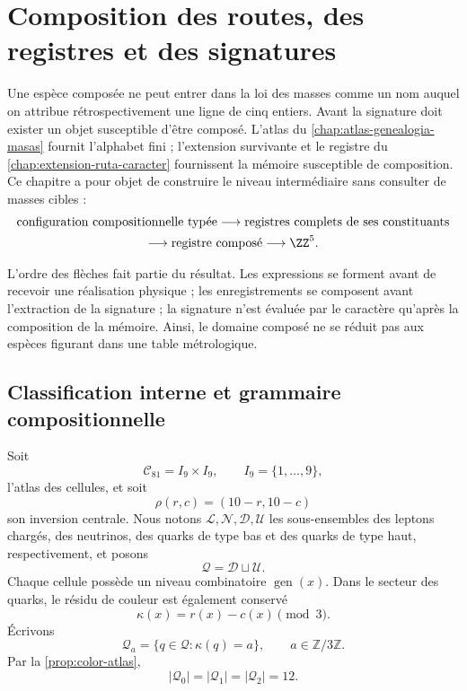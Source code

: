 \chapter{Composition des routes, des registres et des signatures}
\label{chap:composicion-especies-rev6}

Une espèce composée ne peut entrer dans la loi des masses comme un nom auquel on attribue rétrospectivement une ligne de cinq entiers. Avant la signature doit exister un objet susceptible d'être composé. L'atlas du \cref{chap:atlas-genealogia-masas} fournit l'alphabet fini ; l'extension survivante et le registre du \cref{chap:extension-ruta-caracter} fournissent la mémoire susceptible de composition. Ce chapitre a pour objet de construire le niveau intermédiaire sans consulter de masses cibles :
\[
\begin{gathered}
 \text{configuration compositionnelle typée}
 \longrightarrow
 \text{registres complets de ses constituants}\\
 \longrightarrow
 \text{registre composé}
 \longrightarrow
 \ZZ^5.
\end{gathered}
\]

L’ordre des flèches fait partie du résultat. Les expressions se forment avant de recevoir une réalisation physique ; les enregistrements se composent avant l’extraction de la signature ; la signature n’est évaluée par le caractère qu’après la composition de la mémoire. Ainsi, le domaine composé ne se réduit pas aux espèces figurant dans une table métrologique.

\section{Classification interne et grammaire compositionnelle}
\label{sec:alfabeto-composicional-rev6}

Soit
\[
 \mathcal C_{81}=I_9\times I_9,
 \qquad I_9=\{1,\ldots,9\},
\]
l’atlas des cellules, et soit
\[
 \rho(r,c)=(10-r,10-c)
\]
son inversion centrale. Nous notons \(\mathcal L,\mathcal N,\mathcal D,\mathcal U\) les sous-ensembles des leptons chargés, des neutrinos, des quarks de type bas et des quarks de type haut, respectivement, et posons
\[
 \mathcal Q=\mathcal D\sqcup\mathcal U.
\]
Chaque cellule possède un niveau combinatoire \(\operatorname{gen}(x)\). Dans le secteur des quarks, le résidu de couleur est également conservé
\[
 \kappa(x)=r(x)-c(x)\pmod3.
\]
Écrivons
\[
 \mathcal Q_a=\{q\in\mathcal Q:\kappa(q)=a\},
 \qquad a\in\mathbb Z/3\mathbb Z.
\]
Par la \cref{prop:color-atlas},
\[
 |\mathcal Q_0|=|\mathcal Q_1|=|\mathcal Q_2|=12.
\]

